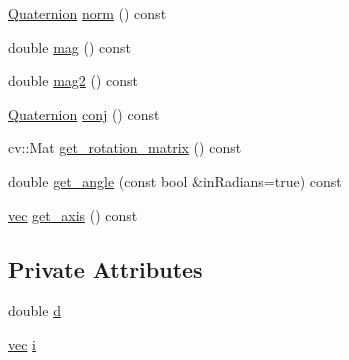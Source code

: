 \begin{DoxyCompactItemize}
\hyperlink{classQuaternion}{\-Quaternion} \hyperlink{classQuaternion_a46a0d444050997f18b33993d52e73a8f}{norm} () const 
\item 
double \hyperlink{classQuaternion_ac1cecf65c0da5c05658a632eabbf9c39}{mag} () const 
\item 
double \hyperlink{classQuaternion_a1e55f492260bed6110558e7023885a2f}{mag2} () const 
\item 
\hyperlink{classQuaternion}{\-Quaternion} \hyperlink{classQuaternion_aaf9deb04a64235eae852d445ab9fa3b2}{conj} () const 
\item 
cv\-::\-Mat \hyperlink{classQuaternion_a9e7eb9b62e96722e98c53683964940b3}{get\-\_\-rotation\-\_\-matrix} () const 
\item 
double \hyperlink{classQuaternion_a01c489526e6cf56dfbaa820972b5ffee}{get\-\_\-angle} (const bool \&in\-Radians=true) const 
\item 
\hyperlink{Vector_8hpp_a8c219a6a32f8455685bd1c3c8072e9f5}{vec} \hyperlink{classQuaternion_a83dcbe1242956b7b6ce3a78e61ce13cb}{get\-\_\-axis} () const 
\end{DoxyCompactItemize}
\subsection*{\-Private \-Attributes}
\begin{DoxyCompactItemize}
\item 
double \hyperlink{classQuaternion_aece65eacbbafecc1d1db0eab1efbf0de}{d}
\item 
\hyperlink{Vector_8hpp_a8c219a6a32f8455685bd1c3c8072e9f5}{vec} \hyperlink{classQuaternion_ae54b34d0a320d6efbfd90195d8103bab}{i}
\end{DoxyCompactItemize}


